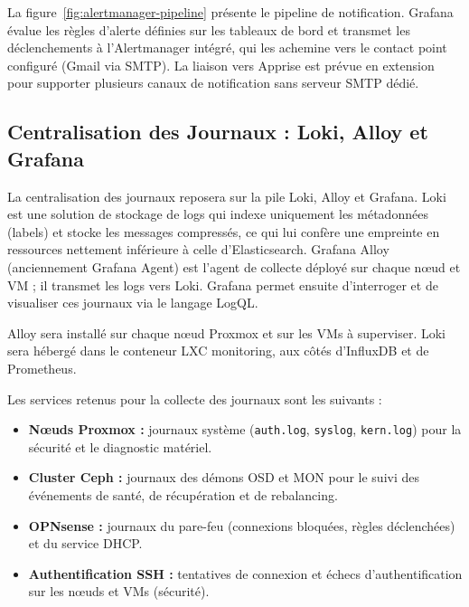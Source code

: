 \par La figure~\ref{fig:alertmanager-pipeline} présente le pipeline de notification. Grafana évalue les règles d'alerte définies sur les tableaux de bord et transmet les déclenchements à l'Alertmanager intégré, qui les achemine vers le contact point configuré (Gmail via SMTP). La liaison vers Apprise est prévue en extension pour supporter plusieurs canaux de notification sans serveur SMTP dédié.

\subsection{Centralisation des Journaux : Loki, Alloy et Grafana}

\par La centralisation des journaux reposera sur la pile Loki, Alloy et Grafana. Loki est une solution de stockage de logs qui indexe uniquement les métadonnées (labels) et stocke les messages compressés, ce qui lui confère une empreinte en ressources nettement inférieure à celle d'Elasticsearch. Grafana Alloy (anciennement Grafana Agent) est l'agent de collecte déployé sur chaque nœud et VM ; il transmet les logs vers Loki. Grafana permet ensuite d'interroger et de visualiser ces journaux via le langage LogQL.

\par Alloy sera installé sur chaque nœud Proxmox et sur les VMs à superviser. Loki sera hébergé dans le conteneur LXC monitoring, aux côtés d'InfluxDB et de Prometheus.

\par Les services retenus pour la collecte des journaux sont les suivants :\\

\begin{itemize}
    \item \textbf{Nœuds Proxmox :} journaux système (\texttt{auth.log}, \texttt{syslog}, \texttt{kern.log}) pour la sécurité et le diagnostic matériel.
    \item \textbf{Cluster Ceph :} journaux des démons OSD et MON pour le suivi des événements de santé, de récupération et de rebalancing.
    \item \textbf{OPNsense :} journaux du pare-feu (connexions bloquées, règles déclenchées) et du service DHCP.
    \item \textbf{Authentification SSH :} tentatives de connexion et échecs d'authentification sur les nœuds et VMs (sécurité).
\end{itemize}

